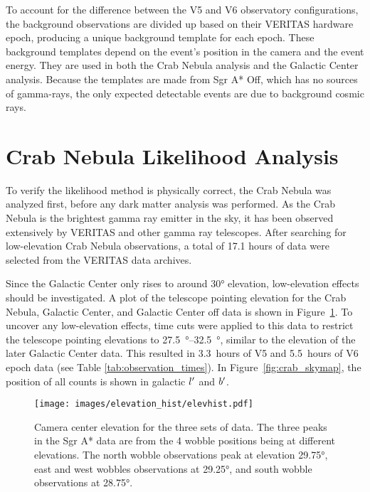   To account for the difference between the V5 and V6 observatory configurations, the background observations are divided up based on their VERITAS hardware epoch, producing a unique background template for each epoch.
  These background templates depend on the event's position in the camera and the event energy.
  They are used in both the Crab Nebula analysis and the Galactic Center analysis.
  Because the templates are made from Sgr A* Off, which has no sources of gamma-rays, the only expected detectable events are due to background cosmic rays.

\section{Crab Nebula Likelihood Analysis}\label{sec:crab_analysis}
  To verify the likelihood method is physically correct, the Crab Nebula was analyzed first, before any dark matter analysis was performed.
  As the Crab Nebula is the brightest gamma ray emitter in the sky, it has been observed extensively by VERITAS and other gamma ray telescopes.
  After searching for low-elevation Crab Nebula observations, a total of 17.1 hours of data were selected from the VERITAS data archives.
  
  Since the Galactic Center only rises to around \ang{30} elevation, low-elevation effects should be investigated.
  A plot of the telescope pointing elevation for the Crab Nebula, Galactic Center, and Galactic Center off data is shown in Figure~\ref{fig:datapointingelevations}.
  To uncover any low-elevation effects, time cuts were applied to this data to restrict the telescope pointing elevations to \SIrange{27.5}{32.5}{\degree}, similar to the elevation of the later Galactic Center data.
  This resulted in \SI{3.3}{hours} of V5 and \SI{5.5}{hours} of V6 epoch data (see Table \ref{tab:observation_times}).
  In Figure~\ref{fig:crab_skymap}, the position of all counts is shown in galactic $l'$ and $b'$.

  \begin{figure}[!ht]
    \centering
    \texttt{[image: images/elevation\_hist/elevhist.pdf]}
    \caption[VERITAS Data Elevation Exposure]{
      Camera center elevation for the three sets of data.
      The three peaks in the Sgr A* data are from the 4 wobble positions being at different elevations.
      The north wobble observations peak at elevation \nicetilde\ang{29.75}, east and west wobbles observations at \nicetilde\ang{29.25}, and south wobble observations at \nicetilde\ang{28.75}.
    }
    \label{fig:datapointingelevations}
  \end{figure}

